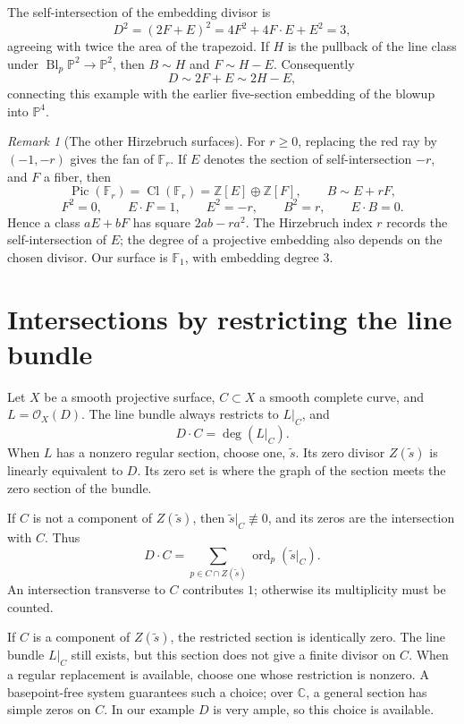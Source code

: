\documentclass[11pt]{article}
\theoremstyle{definition}
\theoremstyle{remark}
\newtheorem{Rmk}{Remark}
\DeclareMathOperator{\ord}{ord}
\DeclareMathOperator{\Cl}{Cl}
\DeclareMathOperator{\Pic}{Pic}
\DeclareMathOperator{\Bl}{Bl}
\newcommand{\cO}{\mathcal{O}}
\newcommand{\bP}{\mathbb{P}}
\newcommand{\bZ}{\mathbb{Z}}
\newcommand{\bC}{\mathbb{C}}
\newcommand{\bF}{\mathbb{F}}
\begin{document}
The self-intersection of the embedding divisor is
\[
    D^2=(2F+E)^2=4F^2+4F\cdot E+E^2=3,
\]
agreeing with twice the area of the trapezoid.
If \(H\) is the pullback of the line class under
\(\Bl_p\bP^2\to\bP^2\), then \(B\sim H\) and \(F\sim H-E\).
Consequently
\[
    D\sim2F+E\sim2H-E,
\]
connecting this example with the earlier five-section embedding
of the blowup into \(\bP^4\).

\begin{Rmk}[The other Hirzebruch surfaces]
    For \(r\geq0\), replacing the red ray by \((-1,-r)\) gives
    the fan of \(\bF_r\). If \(E\) denotes the section of
    self-intersection \(-r\), and \(F\) a fiber, then
    \[
        \Pic(\bF_r)=\Cl(\bF_r)=\bZ[E]\oplus\bZ[F],
        \qquad B\sim E+rF,
    \]
    \[
        F^2=0,\qquad E\cdot F=1,\qquad E^2=-r,
        \qquad B^2=r,\qquad E\cdot B=0.
    \]
    Hence a class \(aE+bF\) has square \(2ab-ra^2\).
    The Hirzebruch index \(r\) records the self-intersection of \(E\);
    the degree of a projective embedding also depends on the chosen
    divisor. Our surface is \(\bF_1\), with embedding degree \(3\).
\end{Rmk}

\section{Intersections by restricting the line bundle}

Let \(X\) be a smooth projective surface, \(C\subset X\) a smooth
complete curve, and \(L=\cO_X(D)\). The line bundle always restricts
to \(L|_C\), and
\[
    \boxed{D\cdot C=\deg(L|_C).}
\]
When \(L\) has a nonzero regular section, choose one,
\(\widetilde{s}\). Its zero divisor
\(Z(\widetilde{s})\) is linearly equivalent to \(D\).
Its zero set is where the graph of the section meets the zero
section of the bundle.

If \(C\) is not a component of \(Z(\widetilde{s})\), then
\(\widetilde{s}|_C\not\equiv0\), and its zeros are the intersection
with \(C\). Thus
\[
    D\cdot C
       =\sum_{p\in C\cap Z(\widetilde{s})}
                         \ord_p(\widetilde{s}|_C).
\]
An intersection transverse to \(C\) contributes \(1\); otherwise its
multiplicity must be counted.

If \(C\) is a component of \(Z(\widetilde{s})\), the restricted
section is identically zero. The line bundle \(L|_C\) still exists,
but this section does not give a finite divisor on \(C\).
When a regular replacement is available, choose one whose restriction
is nonzero. A basepoint-free system guarantees such a choice;
over \(\bC\), a general section has
simple zeros on \(C\). In our example \(D\) is very ample, so this
choice is available.
\end{document}
